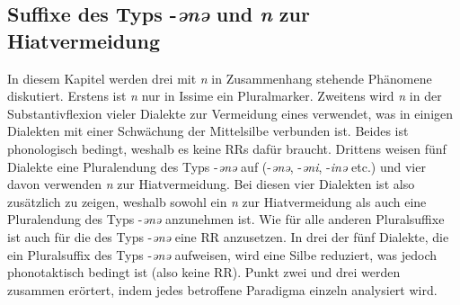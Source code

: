 \subsection{{Suffixe des Typs -\textit{ənə} }{und \textit{n}} {zur Hiatvermeidung}}\label{5.1.4}

In diesem Kapitel werden drei mit \textit{n} in Zusammenhang stehende Phänomene diskutiert. Erstens ist \textit{n} nur in Issime ein Pluralmarker. Zweitens wird \textit{n} in der Substantivflexion vieler Dialekte zur Vermeidung eines  verwendet, was in einigen Dialekten mit einer Schwächung der Mittelsilbe verbunden ist. Beides ist phonologisch bedingt, weshalb es keine RRs dafür braucht. Drittens weisen fünf Dialekte eine Pluralendung des Typs -\textit{ənə} auf (-\textit{ənə}, -\textit{əni}, -\textit{inə} etc.) und vier davon verwenden \textit{n} zur Hiatvermeidung. Bei diesen vier Dialekten ist also zusätzlich zu zeigen, weshalb sowohl ein \textit{n} zur Hiatvermeidung als auch eine Pluralendung des Typs -\textit{ənə} anzunehmen ist. Wie für alle anderen Pluralsuffixe ist auch für die  des Typs -\textit{ənə} eine RR anzusetzen. In drei der fünf Dialekte, die ein Pluralsuffix des Typs -\textit{ənə} aufweisen, wird eine Silbe reduziert, was jedoch phonotaktisch bedingt ist (also keine RR). Punkt zwei und drei werden zusammen erörtert, indem jedes betroffene Paradigma einzeln analysiert wird.

